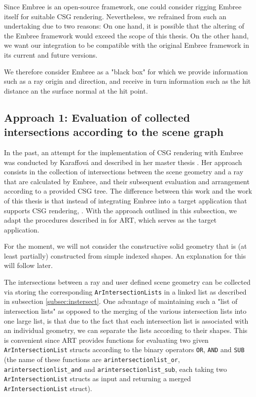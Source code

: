 Since Embree is an open-source framework, one could consider rigging Embree itself for suitable CSG rendering. Nevertheless, we refrained from such an undertaking due to two reasons: On one hand, it is possible that the altering of the Embree framework would exceed the scope of this thesis. On the other hand, we want our integration to be compatible with the original Embree framework in its current and future versions. 

We therefore consider Embree as a "black box" for which we provide information such as a ray origin and direction, and receive in turn information such as the hit distance an the surface normal at the hit point.


\subsection{Approach 1: Evaluation of collected intersections according to the scene graph}
\label{subsec:apprach1}

In the past, an attempt for the implementation of CSG rendering with Embree was conducted by Karaffová and described in her master thesis \cite{karaffova2016}. Her approach consists in the collection of intersections between the scene geometry and a ray that are calculated by Embree, and their subsequent evaluation and arrangement according to a provided CSG tree. The difference between this work and the work of this thesis is that instead of integrating Embree into a target application that supports CSG rendering,  .
With the approach outlined in this subsection, we adapt the procedures described in \cite{karaffova2016} for ART, which serves as the target application. 

For the moment, we will not consider the constructive solid geometry that is (at least partially) constructed from simple indexed shapes. An explanation for this will follow later.

The intersections between a ray and user defined scene geometry can be collected via storing the corresponding \texttt{ArIntersectionLists} in a linked list as described in subsection \ref{subsec:instersect}. One advantage of maintaining such a "list of intersection lists" as opposed to the merging of the various intersection lists into one large list, is that due to the fact that each intersection list is associated with an individual geometry, we can separate the lists according to their shapes. This is convenient since ART provides functions for evaluating two given \texttt{ArIntersectionList} structs according to the binary operators \texttt{OR}, \texttt{AND} and \texttt{SUB} (the name of these functions are \texttt{arintersectionlist\_or}, \texttt{arintersectionlist\_and} and \texttt{arintersectionlist\_sub}, each taking two \texttt{ArIntersectionList} structs as input and returning a merged \texttt{ArIntersectionList} struct).

